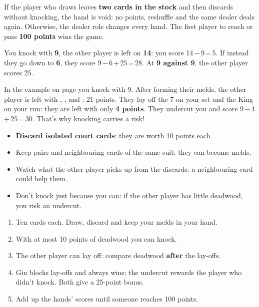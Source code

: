 \documentclass[10pt]{article}
\begin{document}
\startpage
{}
If the player who draws leaves \textbf{two cards in the stock} and then discards without knocking, the hand is void: no points, reshuffle and the same dealer deals again. Otherwise, the dealer role changes every hand. The first player to reach or pass \textbf{100 points} wins the game.
\begin{callout}
You knock with \textbf{9}, the other player is left on \textbf{14}: you score 14\,−\,9\,=\,5. If instead they go down to \textbf{6}, they score 9\,−\,6\,+\,25\,=\,28. At \textbf{9 against 9}, the other player scores 25.
\end{callout}
In the example on page \pageref{gin-esempio} you knock with 9. After forming their melds, the other player is left with , ,  and : 21 points. They lay off the 7 on your set and the King on your run: they are left with only \textbf{4 points}. They undercut you and score 9\,−\,4\,+\,25\,=\,30. That’s why knocking carries a risk!

\begin{itemize}
 \item \textbf{Discard isolated court cards}: they are worth 10 points each.
 \item Keep pairs and neighbouring cards of the same suit: they can become melds.
 \item Watch what the other player picks up from the discards: a neighbouring card could help them.
 \item Don’t knock just because you can: if the other player has little deadwood, you risk an undercut.
\end{itemize}
\begin{callout}
\begin{enumerate}
 \item Ten cards each. Draw, discard and keep your melds in your hand.
 \item With at most 10 points of deadwood you can knock.
 \item The other player can lay off: compare deadwood \textbf{after} the lay-offs.
 \item Gin blocks lay-offs and always wins; the undercut rewards the player who didn’t knock. Both give a 25-point bonus.
 \item Add up the hands’ scores until someone reaches 100 points.
\end{enumerate}
\end{callout}
\vfill
{}
\end{document}

